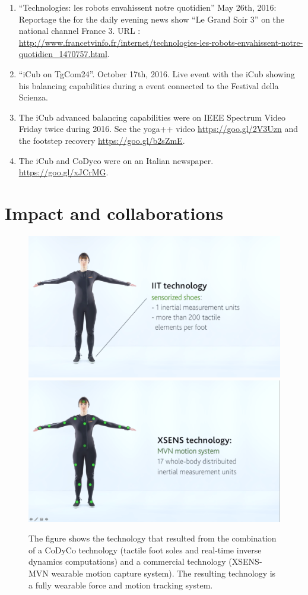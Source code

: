 \documentclass[12pt,a4paper,twoside]{article}
\begin{document}
 \begin{enumerate}
 \item ``Technologies: les robots envahissent notre quotidien''
 May 26th, 2016: Reportage the for the daily evening news show ``Le Grand Soir 3'' on the national channel France 3. URL : \url{http://www.francetvinfo.fr/internet/technologies-les-robots-envahissent-notre-quotidien_1470757.html}.
 
 \item ``iCub on TgCom24''. October 17th, 2016. Live event with the iCub showing his balancing capabilities during
 a event connected to the Festival della Scienza.
 
 \item The iCub advanced balancing capabilities were on IEEE Spectrum Video Friday twice during 2016. 
 See the yoga++ video  
\url{https://goo.gl/2V3Uzn} and the footstep recovery  \url{https://goo.gl/b2sZmE}.

\item The iCub and CoDyco were on an Italian newspaper. \url{https://goo.gl/xJCrMG}.

 \end{enumerate}

\section{Impact and collaborations}

\begin{figure}
  \centering
    \includegraphics[height=.25\textwidth]{images/AnDy-IIT}
    \hspace{1cm}
    \includegraphics[height=.25\textwidth]{images/AnDy-XSENS}
  \caption{The figure shows the technology that resulted from the
  combination of a CoDyCo technology (tactile foot soles and real-time
  inverse dynamics computations) and a commercial technology
  (XSENS-MVN wearable motion capture system). The resulting technology
  is a fully wearable force and motion tracking system.}
 \label{fig:XSENS_IIT}
\end{figure}
\end{document}
